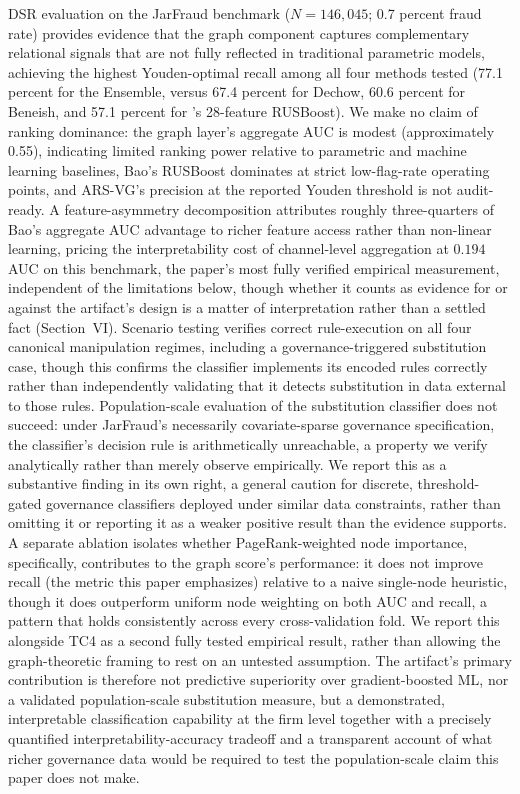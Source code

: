 \documentclass[12pt]{article}
\begin{document}
DSR evaluation on the JarFraud benchmark ($N = 146{,}045$; 0.7 percent
fraud rate) provides evidence that the graph component captures
complementary relational signals that are not fully reflected in
traditional parametric models, achieving the highest Youden-optimal
recall among all four methods tested
(77.1 percent for the Ensemble, versus 67.4 percent for Dechow, 60.6 percent for
Beneish, and 57.1 percent for \citet{bao2020}'s 28-feature RUSBoost).  We make no
claim of ranking dominance: the graph layer's aggregate AUC is modest
(approximately 0.55), indicating limited ranking power relative to
parametric and machine learning baselines, Bao's RUSBoost dominates at
strict low-flag-rate operating points, and ARS-VG's precision at the
reported Youden threshold is not audit-ready.  A feature-asymmetry
decomposition attributes roughly three-quarters of Bao's aggregate AUC
advantage to richer feature access rather than non-linear learning,
pricing the interpretability cost of channel-level aggregation at
$0.194$ AUC on this benchmark, the paper's most fully verified
empirical measurement, independent of the limitations below, though
whether it counts as evidence for or against the artifact's design is
a matter of interpretation rather than a settled fact (Section~VI).
Scenario testing verifies correct rule-execution on all four canonical
manipulation regimes, including a governance-triggered substitution
case, though this confirms the classifier implements its encoded
rules correctly rather than independently validating that it detects
substitution in data external to those rules.  Population-scale
evaluation of the substitution classifier does
not succeed: under JarFraud's necessarily covariate-sparse governance
specification, the classifier's decision rule is arithmetically
unreachable, a property we verify analytically rather than merely
observe empirically.  We report this as a substantive finding in its
own right, a general caution for discrete, threshold-gated governance
classifiers deployed under similar data constraints, rather than
omitting it or reporting it as a weaker positive result than the
evidence supports.  A separate ablation isolates whether PageRank-weighted
node importance, specifically, contributes to the graph score's
performance: it does not improve recall (the metric this paper
emphasizes) relative to a naive single-node heuristic, though it
does outperform uniform node weighting on both AUC and recall, a
pattern that holds consistently across every cross-validation fold.
We report this alongside TC4 as a second fully tested empirical
result, rather than allowing the graph-theoretic framing to rest on
an untested assumption.  The artifact's primary contribution is therefore
not predictive superiority over gradient-boosted ML, nor a validated
population-scale substitution measure, but a demonstrated,
interpretable classification capability at the firm level together
with a precisely quantified interpretability-accuracy tradeoff and a
transparent account of what richer governance data would be required
to test the population-scale claim this paper does not make.
\end{document}
